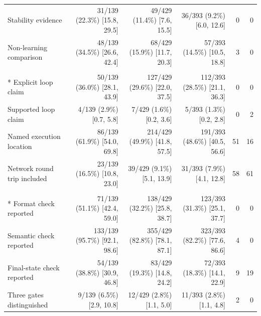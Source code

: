 \begin{table}[tp]
{\begin{tabular}{lrrrrr}
\addlinespace[1.5pt]
Stability evidence & 31/139 (22.3\%) \textcolor{black!60}{[15.8, 29.5]} & 49/429 (11.4\%) \textcolor{black!60}{[7.6, 15.5]} & 36/393 (9.2\%) \textcolor{black!60}{[6.0, 12.6]} & 0 & 0 \\
\addlinespace[1.5pt]
Non-learning comparison & 48/139 (34.5\%) \textcolor{black!60}{[26.6, 42.4]} & 68/429 (15.9\%) \textcolor{black!60}{[11.7, 20.3]} & 57/393 (14.5\%) \textcolor{black!60}{[10.5, 18.8]} & 3 & 0 \\
\addlinespace[1.5pt]
\rowcolor{ebAmber!45}\multicolumn{6}{l}{\textbf{\itshape Control-loop claim and deployment}} \\*
Explicit loop claim & 50/139 (36.0\%) \textcolor{black!60}{[28.1, 43.9]} & 127/429 (29.6\%) \textcolor{black!60}{[22.0, 37.5]} & 112/393 (28.5\%) \textcolor{black!60}{[21.1, 36.3]} & 0 & 0 \\
\addlinespace[1.5pt]
Supported loop claim & 4/139 (2.9\%) \textcolor{black!60}{[0.7, 5.8]} & 7/429 (1.6\%) \textcolor{black!60}{[0.2, 3.6]} & 5/393 (1.3\%) \textcolor{black!60}{[0.2, 2.8]} & 0 & 2 \\
\addlinespace[1.5pt]
Named execution location & 86/139 (61.9\%) \textcolor{black!60}{[54.0, 69.8]} & 214/429 (49.9\%) \textcolor{black!60}{[41.8, 57.5]} & 191/393 (48.6\%) \textcolor{black!60}{[40.5, 56.6]} & 51 & 16 \\
\addlinespace[1.5pt]
Network round trip included & 23/139 (16.5\%) \textcolor{black!60}{[10.8, 23.0]} & 39/429 (9.1\%) \textcolor{black!60}{[5.1, 13.9]} & 31/393 (7.9\%) \textcolor{black!60}{[4.1, 12.8]} & 58 & 61 \\
\addlinespace[1.5pt]
\rowcolor{ebAmber!45}\multicolumn{6}{l}{\textbf{\itshape Validation responsibilities}} \\*
Format check reported & 71/139 (51.1\%) \textcolor{black!60}{[42.4, 59.0]} & 138/429 (32.2\%) \textcolor{black!60}{[25.8, 38.7]} & 123/393 (31.3\%) \textcolor{black!60}{[25.1, 37.7]} & 0 & 0 \\
\addlinespace[1.5pt]
Semantic check reported & 133/139 (95.7\%) \textcolor{black!60}{[92.1, 98.6]} & 355/429 (82.8\%) \textcolor{black!60}{[78.1, 87.1]} & 323/393 (82.2\%) \textcolor{black!60}{[77.6, 86.6]} & 4 & 0 \\
\addlinespace[1.5pt]
Final-state check reported & 54/139 (38.8\%) \textcolor{black!60}{[30.9, 46.8]} & 83/429 (19.3\%) \textcolor{black!60}{[14.8, 24.2]} & 72/393 (18.3\%) \textcolor{black!60}{[14.1, 22.9]} & 9 & 19 \\
\addlinespace[1.5pt]
Three gates distinguished & 9/139 (6.5\%) \textcolor{black!60}{[2.9, 10.8]} & 12/429 (2.8\%) \textcolor{black!60}{[1.1, 5.0]} & 11/393 (2.8\%) \textcolor{black!60}{[1.1, 4.8]} & 2 & 0 \\

\end{tabular}}
\end{table}
